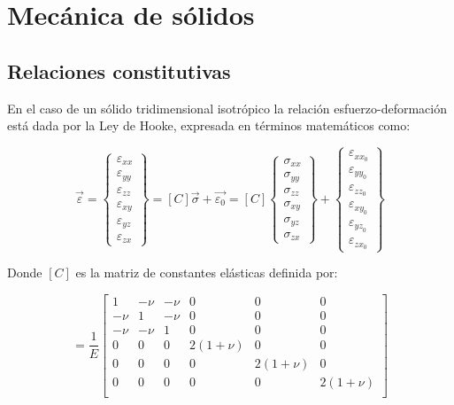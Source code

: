 \section{Mecánica de sólidos}

\subsection{Relaciones constitutivas}

En el caso de un sólido tridimensional isotrópico la relación esfuerzo-deformación está dada por la Ley de Hooke, 
expresada en términos matemáticos como:

\begin{equation}\label{eq:ecdef}
\vec{\varepsilon} = 
\left\{\begin{matrix}
\varepsilon_{xx} \\ \varepsilon_{yy} \\ \varepsilon_{zz} \\ \varepsilon_{xy} \\ \varepsilon_{yz} \\ \varepsilon_{zx}
\end{matrix}\right\} = 
\left[ C \right] \vec{\sigma} + \vec{\varepsilon_0} = 
\left[ C \right]
\left\{\begin{matrix}
\sigma_{xx} \\ \sigma_{yy} \\ \sigma_{zz} \\ \sigma_{xy} \\ \sigma_{yz} \\ \sigma_{zx}
\end{matrix}\right\} + 
\left\{\begin{matrix}
\varepsilon_{xx}_0 \\ \varepsilon_{yy}_0 \\ \varepsilon_{zz}_0 \\ \varepsilon_{xy}_0 \\ \varepsilon_{yz}_0 \\ \varepsilon_{zx}_0
\end{matrix}\right\}
\end{equation}

Donde $[C]$ es la matriz de constantes elásticas definida por:

\begin{equation}
[C] = \frac{1}{E}
\left[\begin{matrix}
1 & -\nu & -\nu & 0 & 0 & 0 \\
-\nu & 1 & -\nu & 0 & 0 & 0 \\
-\nu & -\nu & 1 & 0 & 0 & 0 \\
0 & 0 & 0 & 2(1+\nu) & 0 & 0 \\
0 & 0 & 0 & 0 & 2(1+\nu) & 0 \\
0 & 0 & 0 & 0 & 0 & 2(1+\nu) \\
\end{matrix}\right]
\end{equation}

